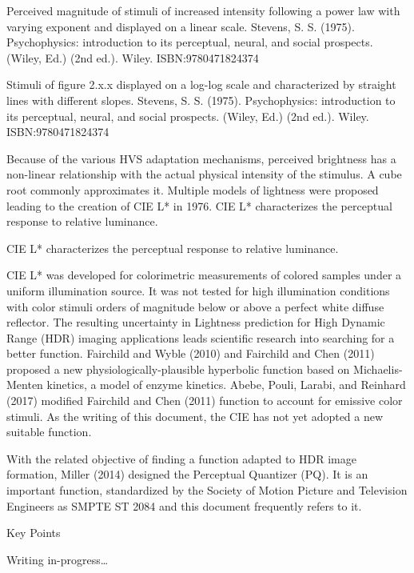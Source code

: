 Perceived magnitude of stimuli of increased intensity following a power law with varying exponent and displayed on a linear scale. Stevens, S. S. (1975). Psychophysics: introduction to its perceptual, neural, and social prospects. (Wiley, Ed.) (2nd ed.). Wiley. ISBN:9780471824374 

Stimuli of figure 2.x.x displayed on a log-log scale and characterized by straight lines with different slopes. Stevens, S. S. (1975). Psychophysics: introduction to its perceptual, neural, and social prospects. (Wiley, Ed.) (2nd ed.). Wiley. ISBN:9780471824374

Because of the various HVS adaptation mechanisms, perceived brightness has a non-linear relationship with the actual physical intensity of the stimulus. A cube root commonly approximates it. Multiple models of lightness were proposed leading to the creation of CIE L* in 1976. CIE L* characterizes the perceptual response to relative luminance.


CIE L* characterizes the perceptual response to relative luminance.

CIE L* was developed for colorimetric measurements of colored samples under a uniform illumination source. It was not tested for high illumination conditions with color stimuli orders of magnitude below or above a perfect white diffuse reflector. The resulting uncertainty in Lightness prediction for High Dynamic Range (HDR) imaging applications leads scientific research into searching for a better function. Fairchild and Wyble (2010) and Fairchild and Chen (2011) proposed a new physiologically-plausible hyperbolic function based on Michaelis-Menten kinetics, a model of enzyme kinetics. Abebe, Pouli, Larabi, and Reinhard (2017) modified Fairchild and Chen (2011) function to account for emissive color stimuli. As the writing of this document, the CIE has not yet adopted a new suitable function.

With the related objective of finding a function adapted to HDR image formation, Miller (2014) designed the Perceptual Quantizer (PQ). It is an important function, standardized by the Society of Motion Picture and Television Engineers as SMPTE ST 2084 and this document frequently refers to it.

Key Points

Writing in-progress…


